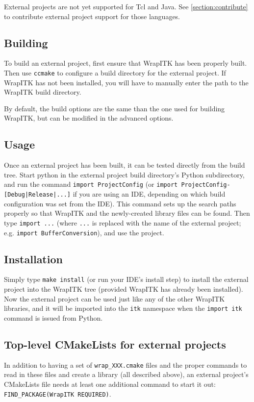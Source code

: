 \documentclass{InsightArticle}
\begin{document}
External projects are not yet supported for Tcl and Java. See \ref{section:contribute}
to contribute external project support for those languages.

    \subsection{Building}
To build an external project, first ensure that WrapITK has been properly built.
Then use \verb$ccmake$ to configure a build directory for the external project. If
WrapITK has not been installed, you will have to manually enter the path to the
WrapITK build directory.

By default, the build options are the same than the one used for building WrapITK,
but can be modified in the advanced options.

    \subsection{Usage}
Once an external project has been built, it can be tested directly from the
build tree. Start python in the external project build directory's Python
subdirectory, and run the command \verb$import ProjectConfig$ (or 
\verb$import ProjectConfig-[Debug|Release|...]$ if you are using an IDE, depending on which
build configuration was set from the IDE). This command sets up the search paths
properly so that WrapITK and the newly-created library files can be found. Then
type \verb$import ...$ (where \verb$...$ is replaced with the name of the external
project; e.g. \verb$import BufferConversion$), and use the project.

    \subsection{Installation}
Simply type \verb$make install$ (or run your IDE's install step) to install the
external project into the WrapITK tree (provided WrapITK has already been
installed). Now the external project can be used just like any of the other
WrapITK libraries, and it will be imported into the \verb$itk$ namespace when the
\verb$import itk$ command is issued from Python.

    \subsection{Top-level CMakeLists for external projects}
In addition to having a set of \verb$wrap_XXX.cmake$ files and the proper
commands to read in these files and create a library (all described above), an
external project's CMakeLists file needs at least one additional command to
start it out: \verb$FIND_PACKAGE(WrapITK REQUIRED)$.
\end{document}
